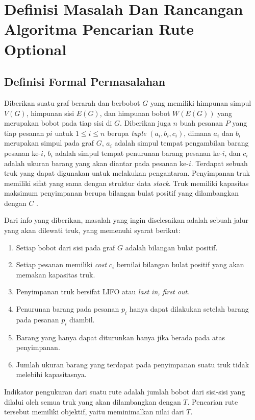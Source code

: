 \chapter{Definisi Masalah Dan Rancangan Algoritma Pencarian Rute Optional}

\section{Definisi Formal Permasalahan}

Diberikan suatu graf berarah dan berbobot $G$ yang memiliki himpunan simpul $V(G)$, himpunan sisi $E(G)$, dan himpunan bobot $W(E(G))$ yang merupakan 
bobot pada tiap sisi di $G$. Diberikan juga $n$ buah pesanan $P$ yang tiap pesanan $pi$ untuk $1 \leq i \leq n$ berupa \textit{tuple} $(a_{i}, b_{i}, c_{i})$, 
dimana $a_{i}$ dan $b_{i}$ merupakan simpul pada graf $G$, $a_{i}$ adalah simpul tempat pengambilan barang pesanan ke-$i$, $b_{i}$ adalah simpul tempat penurunan 
barang pesanan ke-$i$, dan $c_{i}$ adalah ukuran barang yang akan diantar pada pesanan ke-$i$. Terdapat sebuah truk yang dapat digunakan untuk melakukan pengantaran.
Penyimpanan truk memiliki sifat yang sama dengan struktur data \textit{stack}. Truk memiliki kapasitas maksimum penyimpanan 
berupa bilangan bulat positif yang dilambangkan dengan $C$ .

Dari info yang diberikan, masalah yang ingin diselesaikan adalah sebuah jalur yang akan dilewati truk, yang memenuhi syarat berikut:
\begin{enumerate}
    \item Setiap bobot dari sisi pada graf $G$ adalah bilangan bulat positif.
    \item Setiap pesanan memiliki \textit{cost} $c_{i}$ bernilai bilangan bulat positif yang akan memakan kapasitas truk.
    \item Penyimpanan truk bersifat LIFO atau \textit{last in, first out}.
    \item Penurunan barang pada pesanan $p_{i}$ hanya dapat dilakukan setelah barang pada pesanan $p_{i}$ diambil.
    \item Barang yang hanya dapat diturunkan hanya jika berada pada atas penyimpanan.
    \item Jumlah ukuran barang yang terdapat pada penyimpanan suatu truk tidak melebihi kapasitasnya.
\end{enumerate}

Indikator pengukuran dari suatu rute adalah jumlah bobot dari sisi-sisi yang dilalui oleh semua truk yang akan dilambangkan dengan $T$. 
Pencarian rute tersebut memiliki objektif, yaitu meminimalkan nilai dari $T$.

